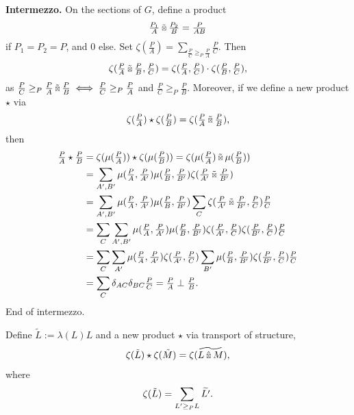 \documentclass[12pt,a4paper]{amsart}
\newcommand{\kstarhat}{\mathbin{\hat{\scalebox{0.61}{$\boxtimes$}}}}
\newcommand{\kstartilde}{\mathbin{\tilde{\scalebox{0.61}{$\boxtimes$}}}}
\begin{document}
\textbf{Intermezzo.}  On the sections of $G$, define a product
\begin{align*}
  \tfrac{P_1}{A} \kstartilde \tfrac{P_2}{B} = \tfrac{P}{AB}
\end{align*}
if $P_1 = P_2 = P$, and $0$ else.  Set $\zeta(\tfrac{P}{A}) = \sum_{\tfrac{P}{C} \geq_P \tfrac{P}{A}} \tfrac{P}{C}$.  Then
\begin{align*}
  \zeta(\tfrac{P}{A} \kstartilde \tfrac{P}{B}, \tfrac{P}{C}) =   \zeta(\tfrac{P}{A}, \tfrac{P}{C}) \cdot   \zeta(\tfrac{P}{B}, \tfrac{P}{C}),
\end{align*}
as $\tfrac{P}{C} \geq_P \tfrac{P}{A} \kstartilde \tfrac{P}{B} \iff \tfrac{P}{C} \geq_P \tfrac{P}{A}$ and $\tfrac{P}{C} \geq_P \tfrac{P}{B}$.
Moreover, if we define a new product $\star$ via
\begin{align*}
  \zeta(\tfrac{P}{A}) \star \zeta(\tfrac{P}{B}) = \zeta(\tfrac{P}{A} \kstartilde \tfrac{P}{B})\text,
\end{align*}
then
\begin{align*}
  \tfrac{P}{A} \star \tfrac{P}{B}
  & = \zeta(\mu(\tfrac{P}{A})) \star \zeta(\mu(\tfrac{P}{B}))
    = \zeta(\mu(\tfrac{P}{A}) \kstartilde \mu(\tfrac{P}{B})) \\
  & = \sum_{A',B'} \mu(\tfrac{P}{A}, \tfrac{P}{A'}) \mu(\tfrac{P}{B}, \tfrac{P}{B'}) \zeta(\tfrac{P}{A'} \kstartilde \tfrac{P}{B'}) \\
  & = \sum_{A',B'} \mu(\tfrac{P}{A}, \tfrac{P}{A'}) \mu(\tfrac{P}{B}, \tfrac{P}{B'}) \sum_{C} \zeta(\tfrac{P}{A'} \kstartilde \tfrac{P}{B'}, \tfrac{P}{C}) \tfrac{P}{C} \\
  & = \sum_C \sum_{A',B'} \mu(\tfrac{P}{A}, \tfrac{P}{A'}) \mu(\tfrac{P}{B}, \tfrac{P}{B'})
    \zeta(\tfrac{P}{A'}, \tfrac{P}{C}) \zeta(\tfrac{P}{B'}, \tfrac{P}{C}) \tfrac{P}{C} \\
  & = \sum_C \sum_{A'} \mu(\tfrac{P}{A}, \tfrac{P}{A'}) \zeta(\tfrac{P}{A'}, \tfrac{P}{C})
    \sum_{B'} \mu(\tfrac{P}{B}, \tfrac{P}{B'}) \zeta(\tfrac{P}{B'}, \tfrac{P}{C}) \tfrac{P}{C} \\
  & = \sum_C \delta_{AC} \delta_{BC} \tfrac{P}{C} = \tfrac{P}{A} \perp \tfrac{P}{B}\text.
\end{align*}
End of intermezzo.

Define $\tilde{L}:= \lambda(L) L$ and a new product $\star$ via transport of structure,
\begin{align*}
  \zeta(\tilde{L}) \star \zeta(\tilde{M}) = \zeta(\widetilde{L \kstarhat M}),
\end{align*}
where
\begin{align*}
  \zeta(\tilde{L}) = \sum_{L' \geq_P L} \widetilde{L'}\text.
\end{align*}
\end{document}
